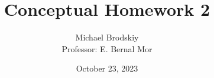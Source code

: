


\title{Conceptual Homework 2}
\date{October 23, 2023}
\author{Michael Brodskiy\\ \small Professor: E. Bernal Mor}



\maketitle


